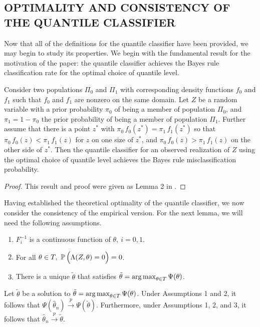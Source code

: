 \subsection{OPTIMALITY AND CONSISTENCY OF  THE QUANTILE CLASSIFIER}
\label{sec:quantile-classifier-optimality}

Now that all of the definitions for the quantile classifier have been provided,
we may begin to study its properties.  We begin with the fundamental result for
the motivation of the paper: the quantile classifier achieves the Bayes rule
classification rate for the optimal choice of quantile level.

\begin{theorem}
  \label{thm:quantile-classifier-is-bayes}
  Consider two populations $\Pi_0$ and $\Pi_1$ with corresponding density
  functions $f_0$ and $f_1$ such that $f_0$ and $f_1$ are nonzero on the same
  domain.  Let $Z$ be a random variable with a prior probability $\pi_0$ of
  being a member of population $\Pi_0$, and $\pi_1 = 1 - \pi_0$ the prior
  probability of being a member of population $\Pi_1$.  Further assume that
  there is a point $z^{*}$ with $\pi_0\, f_0(z^{*}) = \pi_1\, f_1(z^{*})$ so
  that $\pi_0\, f_0(z) < \pi_1\, f_1(z)$ for $z$ on one size of $z^{*}$, and
  $\pi_0\, f_0(z) > \pi_1\, f_1(z)$ on the other side of $z^{*}$.  Then the
  quantile classifier for an observed realization of $Z$ using the optimal
  choice of quantile level achieves the Bayes rule misclassification
  probability.
\end{theorem}

\begin{proof}
  This result and proof were given as Lemma 2 in \cite{hennig2016}.
\end{proof}

Having established the theoretical optimality of the quantile classifier, we now
consider the consistency of the empirical version.  For the next lemma, we will
need the following assumptions.
\begin{enumerate}[label=\emph{Assumption \arabic*.}, align=left]
\item $F_i^{-1}$ is a continuous function of
  $\theta,~ i=0,1$.
\item For all $\theta \in T,~ \mathbb{P}\,\Big( \Lambda(Z, \theta) = 0 \Big) = 0$.
\item There is a unique $\tilde{\theta}$ that satisfies $\tilde{\theta} =
  \operatorname*{arg\,max}_{\theta \in T} \Psi(\theta)$.
\end{enumerate}

\begin{lemma}
  \label{lem:univariate-consistency}
  Let $\tilde{\theta}$ be a solution to
  $\tilde{\theta} = \operatorname*{arg\,max}_{\theta \in T} \Psi(\theta)$.  Under Assumptions 1
  and 2, it follows that
  $\Psi(\hat{\theta}_n) \stackrel{p}{\longrightarrow} \Psi(\tilde{\theta})$.
  Furthermore, under Assumptions 1, 2, and 3, it follows that
  $\hat{\theta}_n \stackrel{p}{\longrightarrow} \tilde{\theta}$.
\end{lemma}

